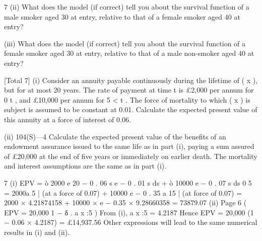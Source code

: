 \documentclass[a4paper,12pt]{article}
\begin{document}
7
(ii) What does the model (if correct) tell you about the survival function of a
male smoker aged 30 at entry, relative to that of a female smoker aged 40
at entry?

(iii) What does the model (if correct) tell you about the survival function of a
female smoker aged 30 at entry, relative to that of a male non-smoker
aged 40 at entry?


[Total 7]
(i) Consider an annuity payable continuously during the lifetime of ( x ), but
for at most 20 years. The rate of payment at time t is £2,000 per annum
for 0 \leq t , and £10,000 per annum for 5 < t . The force of mortality
to which ( x ) is subject is assumed to be constant at 0.01.
Calculate the expected present value of this annuity at a force of interest
of 0.06.

(ii)
104(S)—4
Calculate the expected present value of the benefits of an endowment
assurance issued to the same life as in part (i), paying a sum assured of
£20,000 at the end of five years or immediately on earlier death. The
mortality and interest assumptions are the same as in part (i).



7
(i)
EPV = ò 2000 e
20
− 0 . 06 s
e
− 0 . 01 s
ds + ò 10000 e − 0 . 07 s ds
0
5
= 2000a 5 | (at a force of 0.07) + 10000 e − 0 . 35 a 15 | (at force of 0.07)
= 2000 × 4.21874158 + 10000 × e − 0.35 × 9.28660358 = 73879.07
(ii)
Page 6
(
EPV = 20,000 1 − δ . a x :5
)%
From (i), a x :5 = 4.2187
Hence EPV = 20,000 (1 − 0.06 × 4.2187) = £14,937.56
Other expressions will lead to the same numerical results in (i) and (ii).
\end{document}
